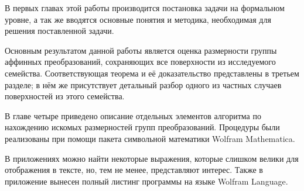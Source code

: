 \documentclass[../main.tex]{subfiles}
\begin{document}
В первых главах этой работы производится постановка задачи на формальном уровне, а так же вводятся основные понятия и методика, необходимая для решения поставленной задачи.

Основным результатом данной работы является оценка размерности группы аффинных преобразований, сохраняющих все поверхности из исследуемого семейства. Соответствующая теорема и её доказательство представлены в третьем разделе; в нём же присутствует детальный разбор одного из частных случаев поверхностей из этого семейства.

В главе четыре приведено описание отдельных элементов алгоритма по нахождению искомых размерностей групп преобразований. Процедуры были реализованы при помощи пакета символьной математики {\ttfamily Wolfram Mathematica}.

В приложениях можно найти некоторые выражения, которые слишком велики для отображения в тексте, но, тем не менее, представляют интерес. Также в приложение вынесен полный листинг программы на языке {\ttfamily Wolfram Language}.
\end{document}
